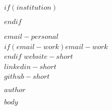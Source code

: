 \documentclass[10pt,article,oneside]{memoir}
\begin{document}

$if(institution)$
\begin{minipage}[t]{2.95in}
\end{minipage}
$endif$
\hfill
\hfill
\begin{minipage}[t]{2in}
  \flushright \footnotesize
  {\scriptsize  \href{mailto:$email-personal$}{$email-personal$} \, \faEnvelope} \\
  $if(email-work)${\scriptsize  \href{mailto:$email-work$}{$email-work$} \, \faEnvelope} \\$endif$
  {\scriptsize  \href{$website$}{$website-short$} \, \faGlobe} \\
  {\scriptsize  \href{$linkedin$}{$linkedin-short$} \, \faLinkedin} \\
  {\scriptsize  \href{$github$}{$github-short$} \, \faGithub} \\
\end{minipage}
\medskip


\begin{flushleft}
  \Large \sffamily \scshape \bfseries $author$
\end{flushleft}
\medskip{}

$body$
\end{document}
